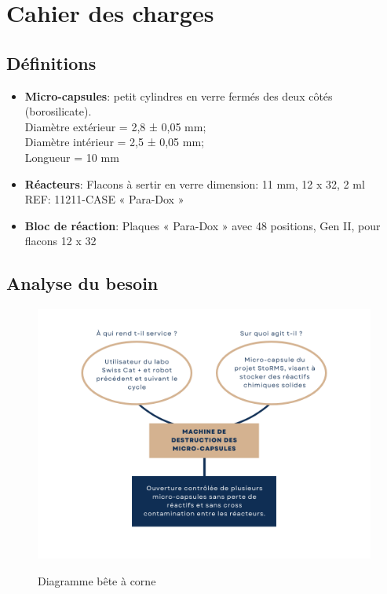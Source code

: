 \section{Cahier des charges}

\subsection{Définitions}

\begin{itemize}[label=\textbullet]
    \item \textbf{Micro-capsules}: petit cylindres en verre fermés des deux côtés (borosilicate). \\ 
    Diamètre extérieur = 2,8 ± 0,05 mm; \\
    Diamètre intérieur = 2,5 ± 0,05 mm; \\
    Longueur = 10 mm

    \item \textbf{Réacteurs}: Flacons à sertir en verre dimension: 11 mm, 12 x 32, 2 ml\\
    REF: 11211-CASE  « Para-Dox »

    \item \textbf{Bloc de réaction}: Plaques « Para-Dox » avec 48 positions, Gen II, pour flacons 12 x 32
\end{itemize}

\subsection{Analyse du besoin}

\begin{figure}[H]
    \centering
    \includegraphics[width=15cm]{Images/Illustrations/CDH/Bete a corne.png}
    \label{fig:beteacorne}
    \caption{Diagramme bête à corne}
\end{figure}

